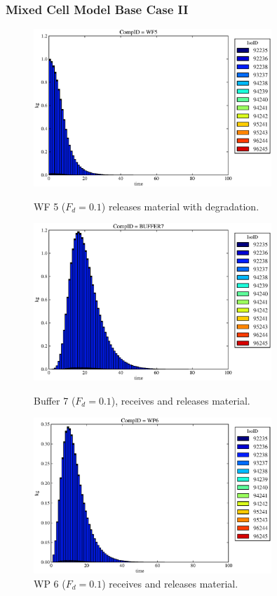 \begin{frame}[ctb!]
  \frametitle{Mixed Cell Model Base Case II}
  \begin{figure}
\begin{minipage}[b]{0.45\linewidth}

  \includegraphics[width=0.8\textwidth]{./images/mcIII1.eps}
  \caption[MCI WF Contaminants.]{
    WF 5 ($F_d = 0.1$) releases material with degradation. 
    }
  \label{fig:mcIIIwf5}
  
  \includegraphics[width=0.8\textwidth]{./images/mcIII3.eps}
  \caption[Case MCI Buffer Contaminants]{
    Buffer 7 ($F_d=0.1$), receives and releases material.
    }
  \label{fig:mcIIIbuff}

\end{minipage}
\hspace{0.05\linewidth}
\begin{minipage}[b]{0.45\linewidth}
  \includegraphics[width=0.8\textwidth]{./images/mcIII2.eps}
  \caption[Case MCI WP Contaminants.]{ 
    WP 6 ($F_d = 0.1$) receives and releases material. 
    }
  \label{fig:mcIIIwp6}


\end{minipage}
\end{figure}
\end{frame}

